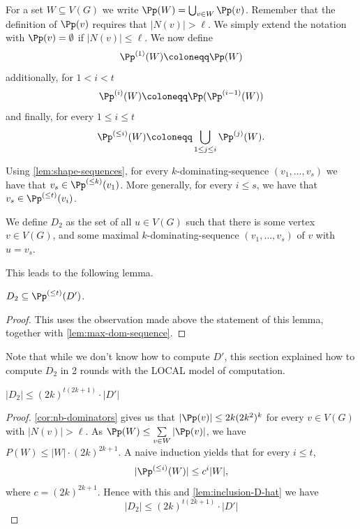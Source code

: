 For a set $W\subseteq V(G)$ we write $\Pp(W) = \bigcup_{v\in W}\Pp(v)$.
Remember that the definition of $\Pp(v)$ requires that $|N(v)|>\ell$. We simply
extend the notation with $\Pp(v)=\emptyset$ if $|N(v)|\le \ell$.
We now define
\[\Pp^{(1)}(W)\coloneqq \Pp(W)\]
additionally, for $1<i <t$
\[\Pp^{(i)}(W)\coloneqq \Pp(\Pp^{(i-1)}(W))\]
and finally, for every $1\le i \le t$
\[\Pp^{(\leq i)}(W)\coloneqq \bigcup_{1\leq j\leq i}\Pp^{(j)}(W).\]





Using \cref{lem:shape-sequences}, for every
$k$-dominating-sequence $(v_1,\ldots,v_s)$ we have that
$v_s \in \Pp^{(\le k)}(v_1)$.
More generally, for every $i\le s$, we have that $v_s\in \Pp^{(\le t)}(v_i)$.


\begin{tcolorbox}
We define $D_2$ as the set of all $u\in V(G)$ such that there is some vertex
$v\in V(G)$, and some maximal $k$-dominating-sequence $(v_1,\ldots,v_s)$ of $v$
with $u=v_s$.
\end{tcolorbox}


This leads to the following lemma.
\begin{lemma}\label{lem:inclusion-D-hat}
  $D_2 \subseteq \Pp^{(\le t)}(D')$.
\end{lemma}
\begin{proof}
  This uses the observation made above the statement of this lemma, together
  with \cref{lem:max-dom-sequence}.
\end{proof}
Note that while we don't know how to compute $D'$, this section explained how
to compute $D_2$ in 2 rounds with the LOCAL model of computation.

\begin{lemma}\label{lem:small-D-hat}
  $|D_2| \le (2k)^{t(2k+1)} \cdot|D'|$
\end{lemma}
\begin{proof}
  \cref{cor:nb-dominators} gives us that $|\Pp(v)|\le 2k(2k^2)^k$ for every
  $v\in V(G)$ with $|N(v)|> \ell$.
  As $\Pp(W) \le \sum\limits_{v\in W} |\Pp(v)|$,
  we have $P(W)\le |W|\cdot (2k)^{2k+1}$.
  A naive induction yields that for every $i\le t$,
  \[ |\Pp^{(\le i)}(W)|\leq c^i|W|, \] where $c=(2k)^{2k+1}$.
  Hence with this and \cref{lem:inclusion-D-hat} we have
  \[|D_2| \le (2k)^{t(2k+1)} \cdot|D'|\]
\end{proof}





